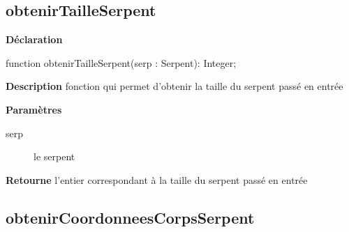 \documentclass{report}
\newif\ifpdf
\begin{document}
\subsection*{obtenirTailleSerpent}
\fi
\label{Types-obtenirTailleSerpent}
\begin{list}{}{
\setlength{\itemindent}{0cm}
\setlength{\listparindent}{0cm}
\setlength{\leftmargin}{\evensidemargin}
\addtolength{\leftmargin}{\tmplength}
\settowidth{\labelsep}{X}
\addtolength{\leftmargin}{\labelsep}
\setlength{\labelwidth}{\tmplength}
}
\item[\textbf{Déclaration}\hfill]
\ifpdf
\begin{flushleft}
\fi
\begin{ttfamily}
function obtenirTailleSerpent(serp : Serpent): Integer;\end{ttfamily}

\ifpdf
\end{flushleft}
\fi

\par
\item[\textbf{Description}]
fonction qui permet d'obtenir la taille du serpent passé en entrée  \par
\item[\textbf{Paramètres}]
\begin{description}
\item[serp] le serpent
\end{description}
\item[\textbf{Retourne}]l'entier correspondant à la taille du serpent passé en entrée


\end{list}
\ifpdf
\subsection*{\large{\textbf{obtenirCoordonneesCorpsSerpent}}\normalsize\hspace{1ex}\hrulefill}
\else
\end{document}
